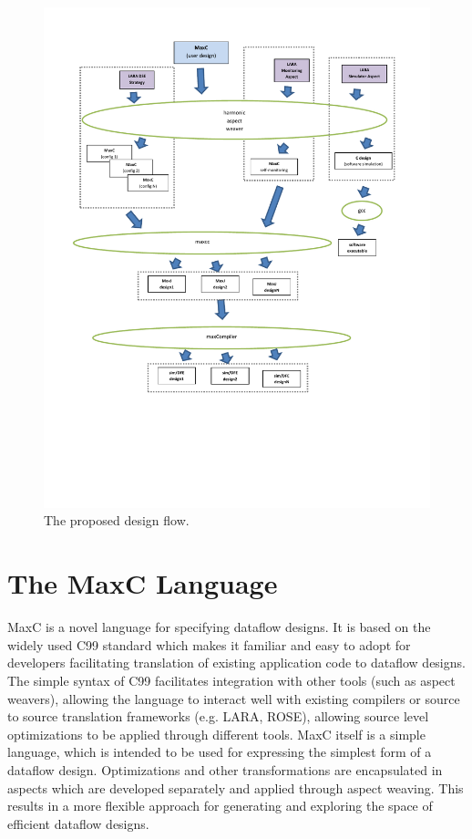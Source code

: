 \begin{figure}[!h]
\includegraphics[scale=0.5, trim=50 180 0 50]{lara_maxcc.pdf}
\caption{The proposed design flow.}
\label{fig:design-flow}
\end{figure}


\section{The  MaxC Language}

MaxC is a novel language for specifying dataflow designs. It is based
on the widely used C99 standard which makes it familiar and easy to
adopt for developers facilitating translation of existing application
code to dataflow designs. The simple syntax of C99 facilitates
integration with other tools (such as aspect weavers), allowing the
language to interact well with existing compilers or source to source
translation frameworks (e.g. LARA, ROSE), allowing source level
optimizations to be applied through different tools. MaxC itself is a
simple language, which is intended to be used for expressing the
simplest form of a dataflow design. Optimizations and other
transformations are encapsulated in aspects which are developed
separately and applied through aspect weaving. This results in a more
flexible approach for generating and exploring the space of efficient
dataflow designs.

